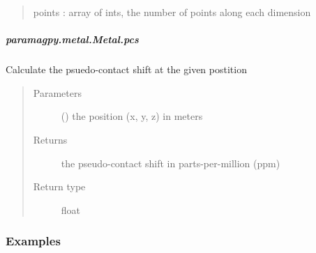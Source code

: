 \documentclass[a4paper,10pt,english]{sphinxmanual}
\begin{document}
\begin{fulllineitems}
\begin{fulllineitems}
\begin{fulllineitems}
\begin{quote}
\begin{description}
\begin{itemize}
\begin{description}
\end{description}

points : array of ints, the number of points along each dimension

\end{itemize}


\end{description}\end{quote}

\end{fulllineitems}



\subparagraph{paramagpy.metal.Metal.pcs}
\label{\detokenize{reference/generated/paramagpy.metal.Metal.pcs:paramagpy-metal-metal-pcs}}\label{\detokenize{reference/generated/paramagpy.metal.Metal.pcs::doc}}

\begin{fulllineitems}
\label{\detokenize{reference/generated/paramagpy.metal.Metal.pcs:paramagpy.metal.Metal.pcs}}
Calculate the psuedo-contact shift at the given postition
\begin{quote}\begin{description}
\item[{Parameters}] \leavevmode
{} () \textendash{} the position (x, y, z) in meters

\item[{Returns}] \leavevmode
{} \textendash{} the pseudo-contact shift in parts-per-million (ppm)

\item[{Return type}] \leavevmode
float

\end{description}\end{quote}
\subsubsection*{Examples}

%
\begin{sphinxVerbatim}[commandchars=\\\{\}]
  
\PYG{p}{[}\PYG{p}{]}
\end{sphinxVerbatim}


\end{fulllineitems}
\end{fulllineitems}
\end{fulllineitems}
\end{document}
